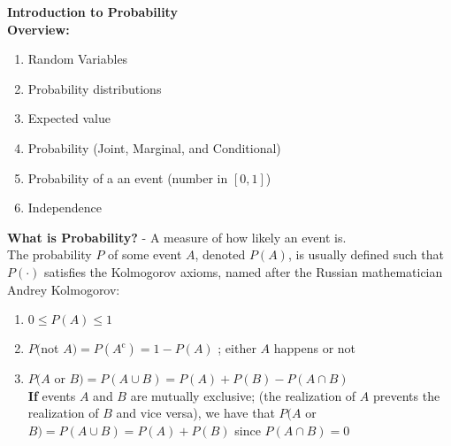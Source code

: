 \documentclass[12pt]{amsart}
\title{}
\author{}
\date{}
\begin{document}
\newpage


{\bf Introduction to Probability }\\

{\bf Overview:}\\






\begin{enumerate}
\item  Random Variables
\item Probability distributions
\item Expected value
\item Probability (Joint, Marginal, and Conditional)
\item Probability of a an event (number in $[0,1]$)
\item Independence
\end{enumerate}

{\bf What is Probability?} - A measure of how likely an event is.\\

The probability $P$ of some event $A$, denoted $P(A)$, is usually defined such that $P(\cdot)$ satisfies the Kolmogorov axioms, named after the Russian mathematician Andrey Kolmogorov:\\

\begin {enumerate}
\item $0 \leq P(A) \leq 1$
\item $P($not $A)=P(A^{\mathrm{c}})=1-P(A)$ ;  either $A$ happens or not
\item $P(A$ or $B)=P(A\cup B)=P(A)+P(B)-P(A\cap B)$\\
{\bf If} events $A$ and $B$ are mutually exclusive; (the realization of $A$ prevents the realization of $B$ and vice versa), we have that $P(A$ or $B)=P(A\cup B)=P(A)+P(B)$ since $P(A\cap B)=0$
\end{enumerate}
\end{document}
